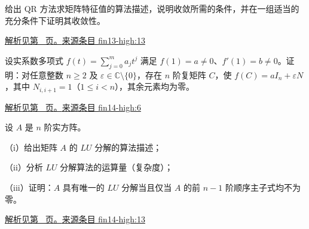\documentclass[12pt,fontset=fandol]{ctexart}
\begin{document}
\begin{example}\label{ex:fin13-high:13}

给出 QR 方法求矩阵特征值的算法描述，说明收敛所需的条件，并在一组适当的充分条件下证明其收敛性。

\par\hyperref[ans:fin13-high:13]{解析见第~\pageref{ans:fin13-high:13} 页。}\quad\href{https://github.com/lzxcr/cmc-mathematics/blob/64916fa1fdbc3e444a652eca204d5669058ee321/src/problems/finals/13/16.md}{来源条目 fin13-high:13}

\end{example}

\begin{example}\label{ex:fin14-high:6}

设实系数多项式 $f(t)=\sum_{j=0}^ma_jt^j$ 满足 $f(1)=a\ne0$、$f'(1)=b\ne0$。证明：对任意整数 $n\ge2$ 及 $\varepsilon\in\mathbb C\setminus\{0\}$，存在 $n$ 阶复矩阵 $C$，使 $f(C)=aI_n+\varepsilon N$，其中 $N_{i,i+1}=1$（$1\le i<n$），其余元素均为零。

\par\hyperref[ans:fin14-high:6]{解析见第~\pageref{ans:fin14-high:6} 页。}\quad\href{https://github.com/lzxcr/cmc-mathematics/blob/64916fa1fdbc3e444a652eca204d5669058ee321/src/problems/finals/14/06.md}{来源条目 fin14-high:6}

\end{example}

\begin{example}\label{ex:fin14-high:13}

设 $A$ 是 $n$ 阶实方阵。

（i）给出矩阵 $A$ 的 $LU$ 分解的算法描述；

（ii）分析 $LU$ 分解算法的运算量（复杂度）；

（iii）证明：$A$ 具有唯一的 $LU$ 分解当且仅当 $A$ 的前 $n-1$ 阶顺序主子式均不为零。

\par\hyperref[ans:fin14-high:13]{解析见第~\pageref{ans:fin14-high:13} 页。}\quad\href{https://github.com/lzxcr/cmc-mathematics/blob/64916fa1fdbc3e444a652eca204d5669058ee321/src/problems/finals/14/16.md}{来源条目 fin14-high:13}

\end{example}
\end{document}
